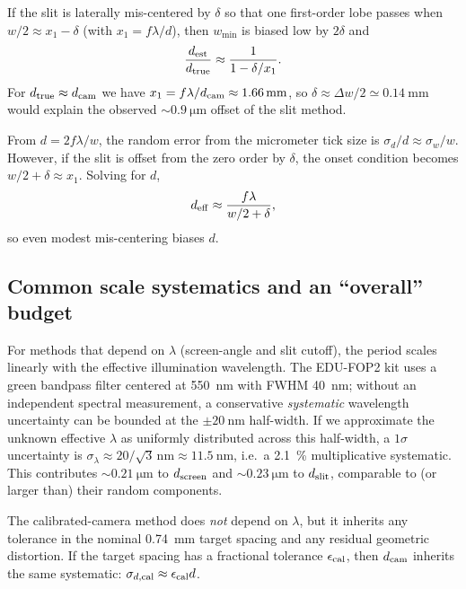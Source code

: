 \documentclass[10pt,twocolumn]{article}
\begin{document}
If the slit is laterally mis-centered by $\delta$ so that one first-order lobe passes when $w/2\approx x_1-\delta$
(with $x_1=f\lambda/d$), then $w_{\min}$ is biased low by $2\delta$ and
\begin{equation}
\frac{d_{\rm est}}{d_{\rm true}}\approx\frac{1}{1-\delta/x_1}.
\end{equation}
For $d_{\rm true}\approx d_{\rm cam}$ we have $x_1=f\lambda/d_{\rm cam}\approx\SI{1.66}{\milli\meter}$, so
$\delta\approx\Delta w/2\simeq\SI{0.14}{\milli\meter}$ would explain the observed $\sim\SI{0.9}{\micro\meter}$
offset of the slit method.


From $d=2f\lambda/w$, the random error from the micrometer tick size is $\sigma_d/d\approx\sigma_w/w$. However, if the slit is offset from the zero order by $\delta$, the onset condition becomes $w/2+\delta\approx x_1$. Solving for $d$,
\begin{equation}
 d_{\rm eff} \approx \frac{f\lambda}{w/2+\delta},
\end{equation}
so even modest mis-centering biases $d$.


\subsection{Common scale systematics and an ``overall'' budget}
For methods that depend on $\lambda$ (screen-angle and slit cutoff), the period scales linearly with the effective
illumination wavelength. The EDU-FOP2 kit uses a green bandpass filter centered at \SI{550}{\nano\meter} with
FWHM \SI{40}{\nano\meter}; without an independent spectral measurement, a conservative \emph{systematic} wavelength
uncertainty can be bounded at the $\pm\SI{20}{\nano\meter}$ half-width. If we approximate the unknown effective
$\lambda$ as uniformly distributed across this half-width, a $1\sigma$ uncertainty is
$\sigma_\lambda \approx 20/\sqrt{3}\,\si{\nano\meter}\approx\SI{11.5}{\nano\meter}$, i.e.\ a \SI{2.1}{\percent}
multiplicative systematic. This contributes $\sim\SI{0.21}{\micro\meter}$ to $d_{\rm screen}$ and
$\sim\SI{0.23}{\micro\meter}$ to $d_{\rm slit}$, comparable to (or larger than) their random components.

The calibrated-camera method does \emph{not} depend on $\lambda$, but it inherits any tolerance in the nominal
\SI{0.74}{\milli\meter} target spacing and any residual geometric distortion. If the target spacing has a fractional
tolerance $\epsilon_{\rm cal}$, then $d_{\rm cam}$ inherits the same systematic: $\sigma_{d,{\rm cal}} \approx \epsilon_{\rm cal} d$.
\end{document}
